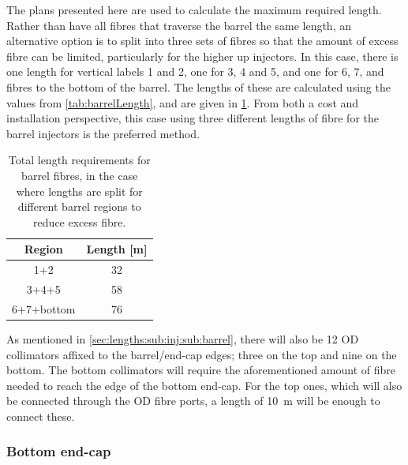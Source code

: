 \documentclass[a4paper,11pt]{article}
\begin{document}
The plans presented here are used to calculate the maximum required length. Rather than have all fibres that traverse the barrel the same length, an alternative option is to split into three sets of fibres so that the amount of excess fibre can be limited, particularly for the higher up injectors. In this case, there is one length for vertical labels 1 and 2, one for 3, 4 and 5, and one for 6, 7, and fibres to the bottom of the barrel. The lengths of these are calculated using the values from \cref{tab:barrelLength}, and are given in \cref{tab:barrelLengthSplit}. From both a cost and installation perspective, this case using three different lengths of fibre for the barrel injectors is the preferred method.
\begin{table}[h!]
\centering
\begin{tabular}{cc}\toprule
Region		&		Length [m]		\\ \midrule
1+2			&		32	\\
3+4+5		&		58	\\
6+7+bottom	&		76	\\ \bottomrule
\end{tabular}
\caption{Total length requirements for barrel fibres, in the case where lengths are split for different barrel regions to reduce excess fibre.}\label{tab:barrelLengthSplit}
\end{table}

As mentioned in \cref{sec:lengths:sub:inj:sub:barrel}, there will also be 12 OD collimators affixed to the barrel/end-cap edges; three on the top and nine on the bottom. The bottom collimators will require the aforementioned amount of fibre needed to reach the edge of the bottom end-cap. For the top ones, which will also be connected through the OD fibre ports, a length of 10~m will be enough to connect these.

\subsubsection{Bottom end-cap}\label{sec:lengths:sub:len:sub:bottom}
\end{document}
